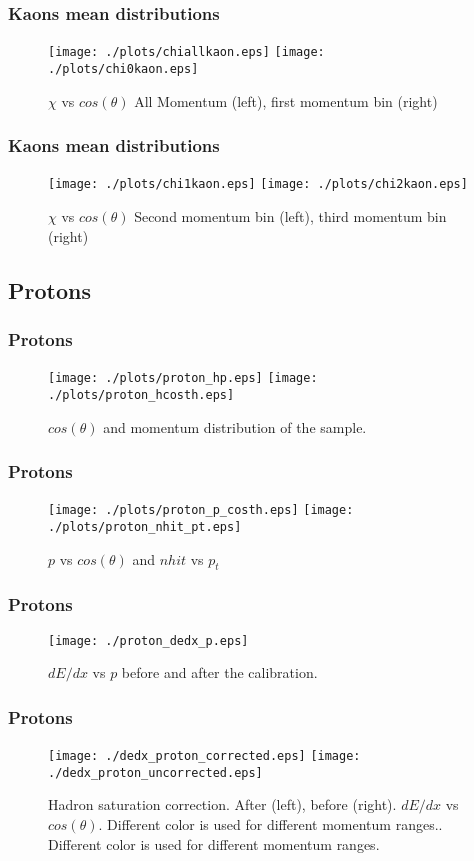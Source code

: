 \documentclass{beamer}
\begin{document}
\begin{frame}\frametitle{Kaons mean distributions}
\begin{figure}[!htp]
\centering
\texttt{[image: ./plots/chiallkaon.eps]}
\texttt{[image: ./plots/chi0kaon.eps]}
\caption{$\chi$ vs $cos(\theta)$ All Momentum (left), first momentum bin (right)}
\end{figure}
\end{frame}

\begin{frame}\frametitle{Kaons mean distributions}
\begin{figure}[!htp]
\centering
\texttt{[image: ./plots/chi1kaon.eps]}
\texttt{[image: ./plots/chi2kaon.eps]}
\caption{$\chi$ vs $cos(\theta)$ Second momentum bin (left), third momentum bin (right)}
\end{figure}
\end{frame}

\subsection{Protons}
\begin{frame}\frametitle{Protons}
\begin{figure}
\texttt{[image: ./plots/proton\_hp.eps]} 
\texttt{[image: ./plots/proton\_hcosth.eps]} 
\caption{$cos(\theta)$ and momentum distribution of the sample.}
\end{figure}
\end{frame}

\begin{frame}\frametitle{Protons}
\begin{figure}
\texttt{[image: ./plots/proton\_p\_costh.eps]} 
\texttt{[image: ./plots/proton\_nhit\_pt.eps]} 
\caption{$p$ vs $cos(\theta)$ and $nhit$ vs $p_{t}$}
\end{figure}
\end{frame}

\begin{frame}\frametitle{Protons}
\begin{figure}
\texttt{[image: ./proton\_dedx\_p.eps]} 
\caption{$dE/dx$ vs $p$ before and after the calibration.}
\end{figure}
\end{frame}

\begin{frame}\frametitle{Protons}
\begin{figure}
\texttt{[image: ./dedx\_proton\_corrected.eps]} 
\texttt{[image: ./dedx\_proton\_uncorrected.eps]} 
\caption{Hadron saturation correction. After (left), before (right). $dE/dx$ vs $cos(\theta)$. Different color is used for different momentum ranges.. Different color is used for different momentum ranges.}
\end{figure}
\end{frame}
\end{document}
